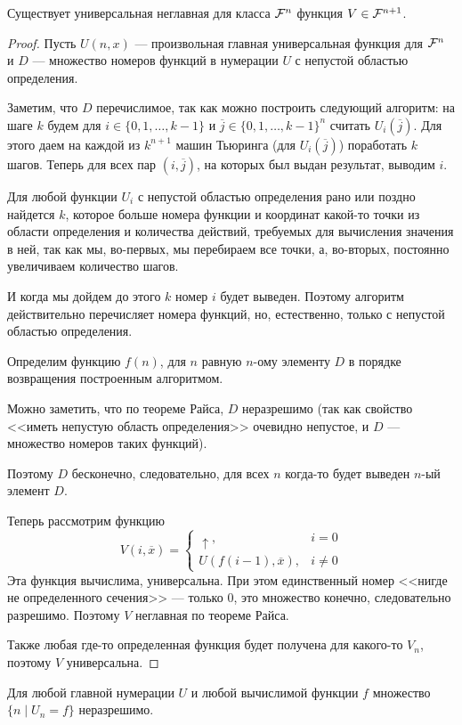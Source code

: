\begin{cor}\label{cor:5}
	Существует универсальная неглавная для класса $ \mathcal{F}^{n}$ функция $ V \in \mathcal{F}^{n+1}$.
\end{cor}
\begin{proof}
	Пусть $ U(n, x)$ --- произвольная главная универсальная функция для $ \mathcal{F}^{n}$ и $ D$ --- множество номеров функций в нумерации $ U$ с непустой областью определения. 

	\vspace{1em}
	Заметим, что $ D$ перечислимое, так как можно построить следующий алгоритм: 
	на шаге $ k$ будем для $ i \in \{0, 1, \ldots , k-1\}$ и $ \overline{j} \in \{0, 1, \ldots, k-1\}^{n}$
	считать $ U_{i}(\overline{j})$.
	Для этого даем на каждой из $ k^{n+1}$ машин Тьюринга (для $ U_i(\overline{j})$) поработать $ k$ шагов.
	Теперь для всех пар $ (i, \overline{j})$, на которых был выдан результат, выводим $ i$.

	Для любой функции  $ U_i$ с непустой областью определения рано или поздно найдется $ k$, которое больше номера функции и координат какой-то точки из области определения и количества действий, требуемых для вычисления значения в ней, так как мы, во-первых, мы перебираем все точки, а, во-вторых, постоянно увеличиваем количество шагов.

	И когда мы дойдем до этого $ k$ номер $ i$ будет выведен. Поэтому алгоритм действительно перечисляет номера функций, но, естественно, только с непустой областью определения.
	\vspace{1em}

	Определим функцию $ f(n)$, для  $ n$ равную $ n$-ому элементу $ D$ в порядке возвращения построенным алгоритмом. 

	Можно заметить, что по теореме Райса, $ D$ неразрешимо (так как свойство <<иметь непустую область определения>> очевидно непустое, и $ D$ --- множество номеров таких функций).

	Поэтому $ D$ бесконечно, следовательно, для всех $ n$ когда-то будет выведен  $ n $-ый элемент $ D$.

	Теперь рассмотрим функцию
	\[
		V(i, \overline{x}) = \begin{cases}
			\uparrow, & i = 0 \\
			U(f(i-1), \overline{x}), & i \ne 0
		\end{cases}
	\] 
 	Эта функция вычислима, универсальна. При этом единственный номер <<нигде не определенного сечения>> --- только $ 0$, это множество конечно, следовательно разрешимо. Поэтому $ V$ неглавная по теореме Райса.

	Также любая где-то определенная функция будет получена для какого-то $ V_n$, поэтому  $ V$ универсальна.
\end{proof}
\begin{cor}
	Для любой главной нумерации $ U$ и любой вычислимой функции $ f$  множество $ \{n \mid U_n = f\}$ неразрешимо.
\end{cor}

